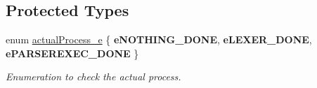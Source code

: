 \subsection*{Protected Types}
\begin{DoxyCompactItemize}
\item 
\hypertarget{class_analyze_aee7ac80c3a9b19650f0d3dd3bf8712d9}{}enum \hyperlink{class_analyze_aee7ac80c3a9b19650f0d3dd3bf8712d9}{actual\+Process\+\_\+e} \{ {\bfseries e\+N\+O\+T\+H\+I\+N\+G\+\_\+\+D\+O\+N\+E}, 
{\bfseries e\+L\+E\+X\+E\+R\+\_\+\+D\+O\+N\+E}, 
{\bfseries e\+P\+A\+R\+S\+E\+R\+E\+X\+E\+C\+\_\+\+D\+O\+N\+E}
 \}\label{class_analyze_aee7ac80c3a9b19650f0d3dd3bf8712d9}

\begin{DoxyCompactList}\small\item\em Enumeration to check the actual process. \end{DoxyCompactList}\end{DoxyCompactItemize}
